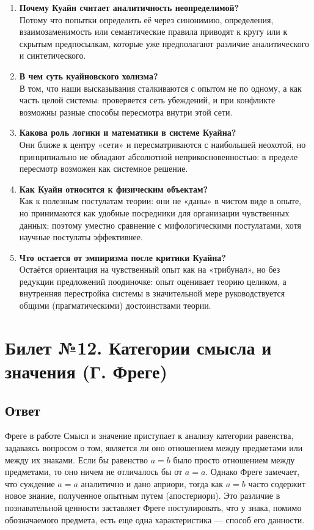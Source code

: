 \documentclass[a4paper,12pt]{article}
\begin{document}
\begin{enumerate}
    \item \textbf{Почему Куайн считает аналитичность неопределимой?}\\
    Потому что попытки определить её через синонимию, определения, взаимозаменимость или семантические правила приводят к кругу или к скрытым предпосылкам, которые уже предполагают различие аналитического и синтетического.
    \item \textbf{В чем суть куайновского холизма?}\\
    В том, что наши высказывания сталкиваются с опытом не по одному, а как часть целой системы: проверяется сеть убеждений, и при конфликте возможны разные способы пересмотра внутри этой сети.
    \item \textbf{Какова роль логики и математики в системе Куайна?}\\
    Они ближе к центру «сети» и пересматриваются с наибольшей неохотой, но принципиально не обладают абсолютной неприкосновенностью: в пределе пересмотр возможен как системное решение.
    \item \textbf{Как Куайн относится к физическим объектам?}\\
    Как к полезным постулатам теории: они не «даны» в чистом виде в опыте, но принимаются как удобные посредники для организации чувственных данных; поэтому уместно сравнение с мифологическими постулатами, хотя научные постулаты эффективнее.
    \item \textbf{Что остается от эмпиризма после критики Куайна?}\\
    Остаётся ориентация на чувственный опыт как на «трибунал», но без редукции предложений поодиночке: опыт оценивает теорию целиком, а внутренняя перестройка системы в значительной мере руководствуется общими (прагматическими) достоинствами теории.
\end{enumerate}


\newpage
\section{Билет №12. Категории смысла и значения (Г. Фреге)}

\subsection{Ответ}

Фреге в работе Смысл и значение приступает к анализу категории равенства, задаваясь вопросом о том, является ли оно отношением между предметами или между их знаками. Если бы равенство $a = b$ было просто отношением между предметами, то оно ничем не отличалось бы от $a = a$. Однако Фреге замечает, что суждение $a = a$ аналитично и дано априори, тогда как $a = b$ часто содержит новое знание, полученное опытным путем (апостериори). Это различие в познавательной ценности заставляет Фреге постулировать, что у знака, помимо обозначаемого предмета, есть еще одна характеристика — способ его данности.
\end{document}
